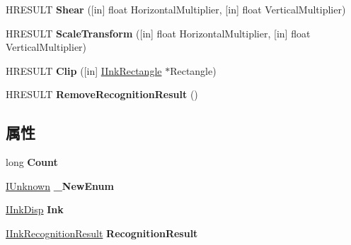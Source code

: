 \begin{DoxyCompactItemize}
H\+R\+E\+S\+U\+LT {\bfseries Shear} (\mbox{[}in\mbox{]} float Horizontal\+Multiplier, \mbox{[}in\mbox{]} float Vertical\+Multiplier)
\item 
\mbox{\label{interface_m_s_i_n_k_a_u_t_lib_1_1_i_ink_strokes_ac128688c930ced6f526c7e53650deacb}} 
H\+R\+E\+S\+U\+LT {\bfseries Scale\+Transform} (\mbox{[}in\mbox{]} float Horizontal\+Multiplier, \mbox{[}in\mbox{]} float Vertical\+Multiplier)
\item 
\mbox{\label{interface_m_s_i_n_k_a_u_t_lib_1_1_i_ink_strokes_ae1a73b96e3a1a24ff0c568c858bda52d}} 
H\+R\+E\+S\+U\+LT {\bfseries Clip} (\mbox{[}in\mbox{]} \hyperlink{interface_m_s_i_n_k_a_u_t_lib_1_1_i_ink_rectangle}{I\+Ink\+Rectangle} $\ast$Rectangle)
\item 
\mbox{\label{interface_m_s_i_n_k_a_u_t_lib_1_1_i_ink_strokes_a56acf2d5988ecc946039d565d4625525}} 
H\+R\+E\+S\+U\+LT {\bfseries Remove\+Recognition\+Result} ()
\end{DoxyCompactItemize}
\subsection*{属性}
\begin{DoxyCompactItemize}
\item 
\mbox{\label{interface_m_s_i_n_k_a_u_t_lib_1_1_i_ink_strokes_af6f27a818ebdf63f2f680e5c842f58e7}} 
long {\bfseries Count}
\item 
\mbox{\label{interface_m_s_i_n_k_a_u_t_lib_1_1_i_ink_strokes_a1a2f3f4059934bb5d6d2ff9ef879a52c}} 
\hyperlink{interface_i_unknown}{I\+Unknown} {\bfseries \+\_\+\+New\+Enum}
\item 
\mbox{\label{interface_m_s_i_n_k_a_u_t_lib_1_1_i_ink_strokes_a34c1bfa96cade9f504a6acb61203f0bb}} 
\hyperlink{interface_m_s_i_n_k_a_u_t_lib_1_1_i_ink_disp}{I\+Ink\+Disp} {\bfseries Ink}
\item 
\mbox{\label{interface_m_s_i_n_k_a_u_t_lib_1_1_i_ink_strokes_acf9324227a713a8a2d7f23580ea048b7}} 
\hyperlink{interface_m_s_i_n_k_a_u_t_lib_1_1_i_ink_recognition_result}{I\+Ink\+Recognition\+Result} {\bfseries Recognition\+Result}
\end{DoxyCompactItemize}
